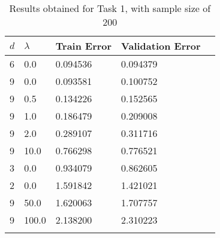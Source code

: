 \def\arraystretch{1.25}
{\small
\begin{longtable}{l l l l l}
\hline
\hline
\textbf{$d$} & \textbf{$\lambda$} & \textbf{Train Error} & \textbf{Validation Error} \\
\hline
\hline
6 & 0.0 & 0.094536 & 0.094379 \\
9 & 0.0 & 0.093581 & 0.100752 \\
9 & 0.5 & 0.134226 & 0.152565 \\
9 & 1.0 & 0.186479 & 0.209008 \\
9 & 2.0 & 0.289107 & 0.311716 \\
9 & 10.0 & 0.766298 & 0.776521 \\
3 & 0.0 & 0.934079 & 0.862605 \\
2 & 0.0 & 1.591842 & 1.421021 \\
9 & 50.0 & 1.620063 & 1.707757 \\
9 & 100.0 & 2.138200 & 2.310223 \\
\hline
\caption{Results obtained for Task 1, with sample size of 200}
\end{longtable}
}